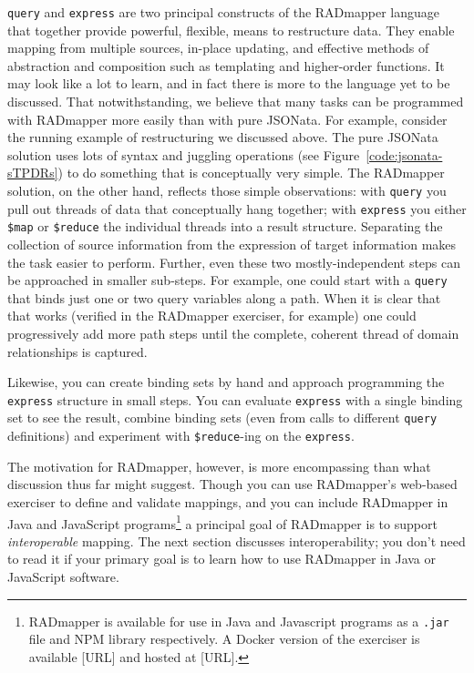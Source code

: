 \documentclass[9pt,letterpaper]{article}
\newcommand{\stt}[1]{\texttt{#1}} %
\begin{document}
\stt{query} and \stt{express} are two principal constructs of the RADmapper language that together provide powerful, flexible, means to restructure data.
They enable mapping from multiple sources, in-place updating, and effective methods of abstraction and composition such as templating and higher-order functions.
It may look like a lot to learn, and in fact there is more to the language yet to be discussed.
That notwithstanding, we believe that many tasks can be programmed with RADmapper more easily than with pure JSONata. 
For example, consider  the running example of restructuring we discussed above.
The pure JSONata solution uses lots of syntax and juggling operations (see Figure~\ref{code:jsonata-sTPDRs}) to do something that is conceptually very simple.
The RADmapper solution, on the other hand, reflects those simple observations: with \stt{query} you pull out threads of data that conceptually hang together;
with \stt{express} you either \stt{\$map} or \stt{\$reduce} the individual threads into a result structure.
Separating the collection of source information from the expression of target information makes the task easier to perform.
Further, even these two mostly-independent steps can be approached in smaller sub-steps.
For example, one could start with a \stt{query} that binds just one or two query variables along a path.
When it is clear that that works (verified in the RADmapper exerciser, for example) one could progressively add more path steps until the complete, coherent thread of domain relationships is captured.

Likewise, you can create binding sets by hand and approach programming the \stt{express} structure in small steps.
You can evaluate \stt{express} with a single binding set to see the result, combine binding sets (even from calls to different \stt{query} definitions) and experiment with \stt{\$reduce}-ing on the \stt{express}.

The motivation for RADmapper, however, is more encompassing than what discussion thus far might suggest.
Though you can use RADmapper's web-based exerciser to define and validate mappings,
and you can include RADmapper in Java and JavaScript programs\footnote{RADmapper is available for use in Java and Javascript programs as a \stt{.jar} file and NPM library respectively. A Docker version of the exerciser is available [URL] and hosted at [URL].} a principal goal of RADmapper is to support \textit{interoperable} mapping. The next section discusses interoperability; you don't need to read it if your primary goal is to learn how to use RADmapper in Java or JavaScript software.
\end{document}
